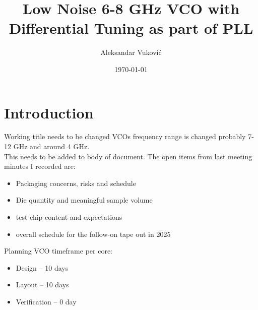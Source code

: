 \documentclass{article}
\title{Low Noise 6-8 GHz VCO with Differential Tuning as part of PLL} %
\author{Aleksandar Vuković} %
\date{\today} %
\begin{document}
\maketitle %


\section{Introduction}

Working title needs to be changed VCOs frequency range is changed probably 7-12 GHz and around 4 GHz. %
\\
This needs to be added to body of document. The open items from last meeting minutes I recorded are:

\begin{itemize}
	\item Packaging concerns, risks and schedule
	\item Die quantity and meaningful sample volume
	\item test chip content and expectations
	\item overall schedule for the follow-on tape out in 2025
\end{itemize}

Planning VCO timeframe per core:

\begin{itemize}
	\item Design -- 10 days
	\item Layout -- 10 days
	\item Verification -- 0 day
\end{itemize}







\newpage

\end{document}
